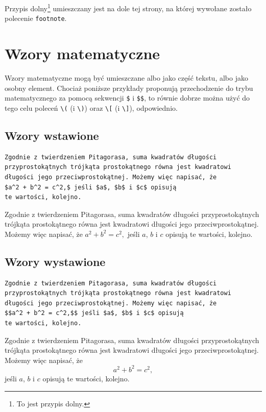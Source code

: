 \documentclass[oneside]{amuthesis}
\begin{document}
\noindent Przypis dolny\footnote{To jest przypis dolny.} umieszczany
jest na dole tej strony, na której wywołane zostało
polecenie \texttt{footnote}.

\section{Wzory matematyczne}

Wzory matematyczne mogą być umieszczane albo jako część tekstu, albo jako osobny element. Chociaż poniższe przykłady proponują przechodzenie do trybu matematycznego za pomocą sekwencji \verb|$| i \verb|$$|, to równie dobrze można użyć do tego celu poleceń \verb|\(| (i \verb|\)|) oraz \verb|\[| (i \verb|\]|), odpowiednio.

\subsection{Wzory wstawione}

\begin{verbatim}
Zgodnie z twierdzeniem Pitagorasa, suma kwadratów długości
przyprostokątnych trójkąta prostokątnego równa jest kwadratowi
długości jego przeciwprostokątnej. Możemy więc napisać, że
$a^2 + b^2 = c^2,$ jeśli $a$, $b$ i $c$ opisują
te wartości, kolejno.
\end{verbatim}

\noindent Zgodnie z twierdzeniem Pitagorasa, suma kwadratów długości
przyprostokątnych trójkąta prostokątnego równa jest kwadratowi
długości jego przeciwprostokątnej. Możemy więc napisać, że
$a^2 + b^2 = c^2,$ jeśli $a$, $b$ i $c$ opisują
te wartości, kolejno.

\subsection{Wzory wystawione}

\begin{verbatim}
Zgodnie z twierdzeniem Pitagorasa, suma kwadratów długości
przyprostokątnych trójkąta prostokątnego równa jest kwadratowi
długości jego przeciwprostokątnej. Możemy więc napisać, że
$$a^2 + b^2 = c^2,$$ jeśli $a$, $b$ i $c$ opisują
te wartości, kolejno.
\end{verbatim}

\noindent Zgodnie z twierdzeniem Pitagorasa, suma kwadratów długości
przyprostokątnych trójkąta prostokątnego równa jest kwadratowi
długości jego przeciwprostokątnej. Możemy więc napisać, że
$$a^2 + b^2 = c^2,$$ jeśli $a$, $b$ i $c$ opisują
te wartości, kolejno.
\end{document}
